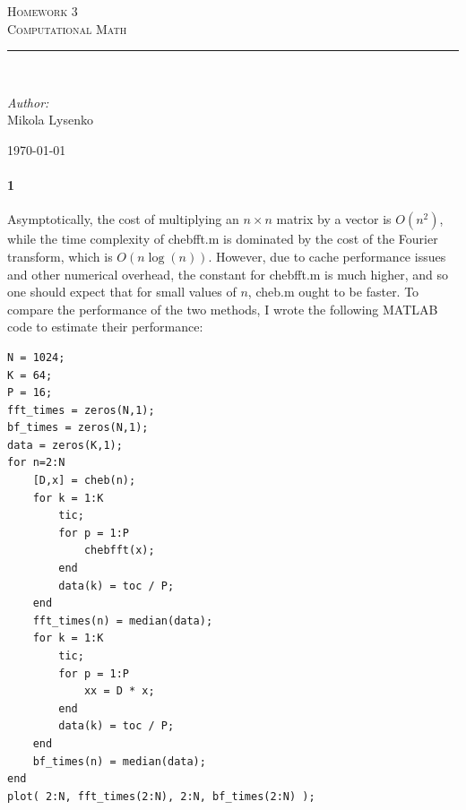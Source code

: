 \documentclass{article}
\newcommand{\HRule}{\rule{\linewidth}{0.5mm}}
\begin{document}
\begin{titlepage}
 
\begin{center}
 
\textsc{\LARGE Homework 3}\\[1.5cm] 

\textsc{\Large Computational Math}\\[0.5cm]
 
 
\HRule \\[2cm]
 
\begin{minipage}{0.4\textwidth}
\begin{flushleft} \large
\emph{Author:}\\
Mikola Lysenko
\end{flushleft}
\end{minipage}
 
\vfill
 
{\large \today}
 
\end{center}
 
\end{titlepage}


\paragraph{1} Asymptotically, the cost of multiplying an $n\times n$ matrix by a vector is $O(n^2)$, while the time complexity of chebfft.m is dominated by the cost of the Fourier transform, which is $O(n \log(n))$.  However, due to cache performance issues and other numerical overhead, the constant for chebfft.m is much higher, and so one should expect that for small values of $n$, cheb.m ought to be faster.  To compare the performance of the two methods, I wrote the following MATLAB code to estimate their performance:

\begin{verbatim}
N = 1024;
K = 64;
P = 16;
fft_times = zeros(N,1);
bf_times = zeros(N,1);
data = zeros(K,1);
for n=2:N
    [D,x] = cheb(n);
    for k = 1:K
        tic;
        for p = 1:P
            chebfft(x);
        end
        data(k) = toc / P;
    end
    fft_times(n) = median(data);
    for k = 1:K
        tic;
        for p = 1:P
            xx = D * x;
        end
        data(k) = toc / P;
    end
    bf_times(n) = median(data); 
end
plot( 2:N, fft_times(2:N), 2:N, bf_times(2:N) );
\end{verbatim}
\end{document}
